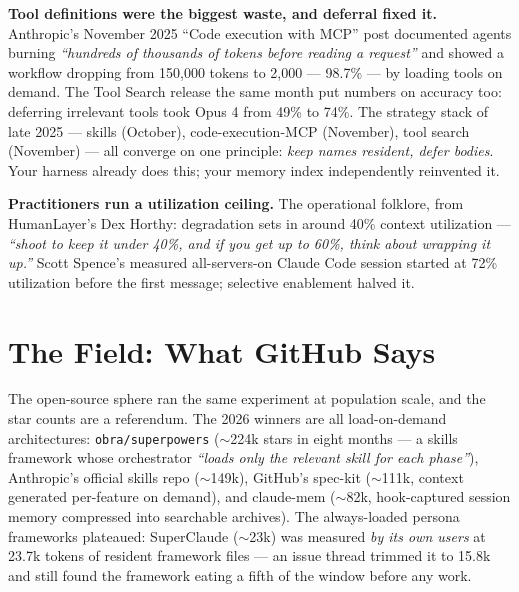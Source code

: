 \documentclass[11pt,letterpaper]{article}
\begin{document}
\textbf{Tool definitions were the biggest waste, and deferral fixed it.} Anthropic's November 2025 ``Code execution with MCP'' post documented agents burning \textit{``hundreds of thousands of tokens before reading a request''} and showed a workflow dropping from 150,000 tokens to 2,000 --- 98.7\% --- by loading tools on demand. The Tool Search release the same month put numbers on accuracy too: deferring irrelevant tools took Opus 4 from 49\% to 74\%. The strategy stack of late 2025 --- skills (October), code-execution-MCP (November), tool search (November) --- all converge on one principle: \textit{keep names resident, defer bodies}. Your harness already does this; your memory index independently reinvented it.

\textbf{Practitioners run a utilization ceiling.} The operational folklore, from HumanLayer's Dex Horthy: degradation sets in around 40\% context utilization --- \textit{``shoot to keep it under 40\%, and if you get up to 60\%, think about wrapping it up.''} Scott Spence's measured all-servers-on Claude Code session started at 72\% utilization before the first message; selective enablement halved it.

\section{The Field: What GitHub Says}

The open-source sphere ran the same experiment at population scale, and the star counts are a referendum. The 2026 winners are all load-on-demand architectures: \texttt{obra/superpowers} ($\sim$224k stars in eight months --- a skills framework whose orchestrator \textit{``loads only the relevant skill for each phase''}), Anthropic's official skills repo ($\sim$149k), GitHub's spec-kit ($\sim$111k, context generated per-feature on demand), and claude-mem ($\sim$82k, hook-captured session memory compressed into searchable archives). The always-loaded persona frameworks plateaued: SuperClaude ($\sim$23k) was measured \textit{by its own users} at 23.7k tokens of resident framework files --- an issue thread trimmed it to 15.8k and still found the framework eating a fifth of the window before any work.
\end{document}
